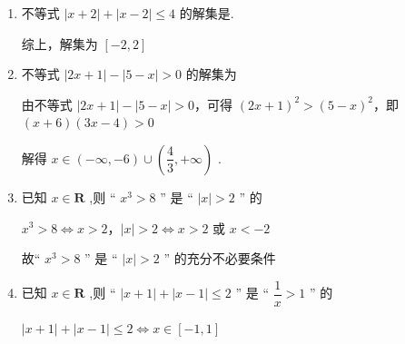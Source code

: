 \begin{enumerate}
    \item 不等式 $\left| {x + 2}\right|  + \left| {x - 2}\right|  \leq  4$ 的解集是.
    \begin{jieda}
        综上，解集为 $\left\lbrack  {-2,2}\right\rbrack$
    \end{jieda} 
    \item 不等式 $\left| {{2x} + 1}\right|  - \left| {5 - x}\right|  > 0$ 的解集为
    \begin{jieda}
        由不等式 $\left| {{2x} + 1}\right|  - \left| {5 - x}\right|  > 0$，可得 ${\left( 2x + 1\right) }^{2} > {\left( 5 - x\right) }^{2}$，即 $\left( {x + 6}\right) \left( {{3x} - 4}\right)  > 0$
        
        解得 $x \in  \left( {-\infty , - 6}\right)  \cup  \left( {\dfrac{4}{3}, + \infty }\right)$ .
    \end{jieda}
    
    \item 已知 $x \in  \mathbf{R}$ ,则 “ ${x}^{3} > 8$ ” 是 “ $\left| x\right|  > 2$ ” 的
    \begin{jieda}
        ${x}^{3} > 8 \Longleftrightarrow  x > 2$，$\left| x\right|  > 2 \Longleftrightarrow  x > 2$ 或 $x <  - 2$

        故“ ${x}^{3} > 8$ ” 是 “ $\left| x\right|  > 2$ ” 的充分不必要条件
    \end{jieda} 
    \item 已知 $x \in  \mathbf{R}$ ,则 “ $\left| {x + 1}\right|  + \left| {x - 1}\right|  \leq  2$ ” 是 “ $\dfrac{1}{x} > 1$ ” 的
    \begin{jieda}
        $\left| {x + 1}\right|  + \left| {x - 1}\right|  \leq  2 \Longleftrightarrow x \in \left\lbrack  {-1,1}\right\rbrack$


\end{jieda}
\end{enumerate}
